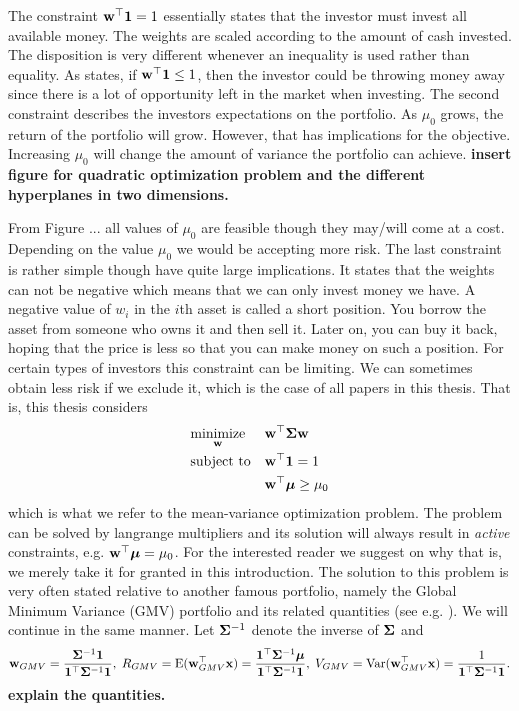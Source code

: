 \documentclass[]{book}
\begin{document}
The constraint $\mathbf{w}^\top \mathbf{1} = 1$ essentially states that the investor must invest all available money. 
The weights are scaled according to the amount of cash invested.
The disposition is very different whenever an inequality is used rather than equality. 
As \citet{hult2012risk} states, if $\mathbf{w}^\top \mathbf{1} \leq 1$, then the investor could be throwing money away since there is a lot of opportunity left in the market when investing.
The second constraint describes the investors expectations on the portfolio. 
As $\mu_0$ grows, the return of the portfolio will grow. 
However, that has implications for the objective. 
Increasing $\mu_0$ will change the amount of variance the portfolio can achieve. 
\textbf{insert figure for quadratic optimization problem and the different hyperplanes in two dimensions.}

From Figure ... all values of $\mu_0$ are feasible though they may/will come at a cost. 
Depending on the value $\mu_0$ we would be accepting more risk. 
The last constraint is rather simple though have quite large implications. 
It states that the weights can not be negative which means that we can only invest money we have. 
A negative value of $w_i$ in the $i$th asset is called a short position.
You borrow the asset from someone who owns it and then sell it. 
Later on, you can buy it back, hoping that the price is less so that you can make money on such a position. 
For certain types of investors this constraint can be limiting.
We can sometimes obtain less risk if we exclude it, which is the case of all papers in this thesis. That is, this thesis considers
\begin{equation}\label{eqn:mean_variance}
\begin{aligned}
& \underset{\mathbf{w}}{\text{minimize}} 
& & \mathbf{w}^\top \mathbf{\Sigma} \mathbf{w} \\
& \text{subject to}
& & \mathbf{w}^\top \mathbf{1} = 1 \\
& && \mathbf{w}^\top \mbox{\boldmath$\mu$} \geq \mu_0 \\
\end{aligned}
\end{equation}
which is what we refer to the mean-variance optimization problem. 
The problem can be solved by langrange multipliers and its solution will always result in \textit{active} constraints, e.g. $\mathbf{w}^\top \mbox{\boldmath$\mu$} = \mu_0$. 
For the interested reader we suggest \citet{} on why that is, we merely take it for granted in this introduction. 
The solution to this problem is very often stated relative to another famous portfolio, namely the Global Minimum Variance (GMV) portfolio and its related quantities (see e.g. \citet{Bodnar2009CaIotEFiEM, bodnar2013equivalence, bauder2018bayesian}). We will continue in the same manner. Let $\mathbf{\Sigma}^{-1}$ denote the inverse of $\mathbf{\Sigma}$ and 
\begin{equation}
	\mathbf{w}_{GMV} = \frac{\mathbf{\Sigma}^{-1}\mathbf{1}}{\mathbf{1}^\top \mathbf{\Sigma}^{-1}\mathbf{1}}, \; R_{GMV} =\operatorname{E}(\mathbf{w}_{GMV}^\top\mathbf{x}) = \frac{\mathbf{1}^\top\mathbf{\Sigma}^{-1}\mbox{\boldmath$\mu$}}{\mathbf{1}^\top \mathbf{\Sigma}^{-1}\mathbf{1}}, \;
	V_{GMV} = \operatorname{Var}(\mathbf{w}_{GMV}^\top\mathbf{x}) =\frac{1}{\mathbf{1}^\top \mathbf{\Sigma}^{-1}\mathbf{1}}.
\end{equation}
 \textbf{explain the quantities.}
  
\end{document}
